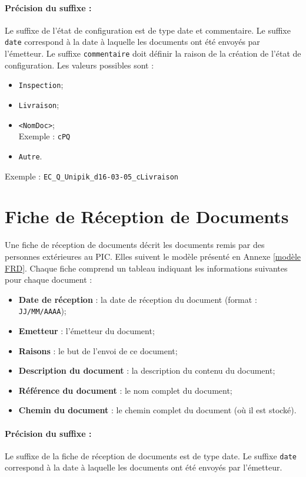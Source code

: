 \paragraph{Précision du suffixe :}
Le suffixe de l'état de configuration est de type date et commentaire. Le suffixe \verb+date+ correspond à la date à laquelle les documents ont été envoyés par l’émetteur. Le suffixe \verb+commentaire+ doit définir la raison de la création de l'état de configuration. Les valeurs possibles sont :
\begin{itemize}
\item \verb+Inspection+;
\item \verb+Livraison+;
\item \verb+<NomDoc>+; \\
Exemple : \verb+cPQ+
\item \verb+Autre+.
\end{itemize}
Exemple : \verb+EC_Q_Unipik_d16-03-05_cLivraison+

\section{Fiche de Réception de Documents}
\label{FRD}

Une fiche de réception de documents décrit les documents remis par des personnes extérieures au PIC. Elles suivent le modèle présenté en Annexe \ref{modèle FRD}. Chaque fiche comprend un tableau indiquant les informations suivantes pour chaque document :
\begin{itemize}
\item \textbf{Date de réception} : la date de réception du document (format : \verb+JJ/MM/AAAA+);
\item \textbf{Emetteur} : l'émetteur du document;
\item \textbf{Raisons} : le but de l'envoi de ce document;
\item \textbf{Description du document} : la description du contenu du document;
\item \textbf{Référence du document} : le nom complet du document;
\item \textbf{Chemin du document} : le chemin complet du document (où il est stocké).
\end{itemize}

\paragraph{Précision du suffixe :}
Le suffixe de la fiche de réception de documents est de type date. Le suffixe \verb+date+ correspond à la date à laquelle les documents ont été envoyés par l’émetteur.